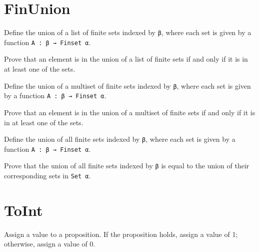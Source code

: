 \section{FinUnion}

\begin{definition}\label{List.FinUnion}
  \leanok
  Define the union of a list of finite sets indexed by \verb|β|, where each set is given by a function \verb|A : β → Finset α|.
\end{definition}

\begin{lemma}\label{List.eq_FinUnion}
  Prove that an element is in the union of a list of finite sets if and only if it is in at least one of the sets.
\end{lemma}

\begin{definition}\label{Multiset.FinUnion}
  Define the union of a multiset of finite sets indexed by \verb|β|, where each set is given by a function \verb|A : β → Finset α|.
\end{definition}

\begin{lemma}\label{Multiset.eq_FinUnion}
  Prove that an element is in the union of a multiset of finite sets if and only if it is in at least one of the sets.
\end{lemma}

\begin{definition}\label{FinUnion₀}
  Define the union of all finite sets indexed by \verb|β|, where each set is given by a function \verb|A : β → Finset α|.
\end{definition}

\begin{lemma}\label{eq_FinUnion₀}
  Prove that the union of all finite sets indexed by \verb|β| is equal to the union of their corresponding sets in \verb|Set α|.
\end{lemma}

\section{ToInt}

\begin{definition}\label{toInt}
  \leanok
  Assign a value to a proposition. If the proposition holds, assign a value of 1; otherwise, assign a value of 0.
\end{definition}

